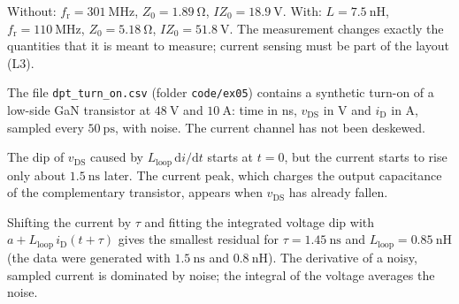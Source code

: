 
\begin{solutionblock}
	Without: $f_\mathrm{r}=\SI{301}{\mega\hertz}$, $Z_0=\SI{1.89}{\ohm}$, $IZ_0=\SI{18.9}{\volt}$. With: $L=\SI{7.5}{\nano\henry}$, $f_\mathrm{r}=\SI{110}{\mega\hertz}$, $Z_0=\SI{5.18}{\ohm}$, $IZ_0=\SI{51.8}{\volt}$. The measurement changes exactly the quantities that it is meant to measure; current sensing must be part of the layout (L3).
\end{solutionblock}



The file \texttt{dpt\_turn\_on.csv} (folder \texttt{code/ex05}) contains a synthetic turn-on of a low-side GaN transistor at $\SI{48}{\volt}$ and $\SI{10}{\ampere}$: time in ns, $v_\mathrm{DS}$ in V and $i_\mathrm{D}$ in A, sampled every $\SI{50}{\pico\second}$, with noise. The current channel has not been deskewed.


\begin{solutionblock}
	The dip of $v_\mathrm{DS}$ caused by $L_\mathrm{loop}\,\mathrm{d}i/\mathrm{d}t$ starts at $t=0$, but the current starts to rise only about $\SI{1.5}{\nano\second}$ later. The current peak, which charges the output capacitance of the complementary transistor, appears when $v_\mathrm{DS}$ has already fallen.
\end{solutionblock}


\begin{solutionblock}
	Shifting the current by $\tau$ and fitting the integrated voltage dip with $a+L_\mathrm{loop}\,i_\mathrm{D}(t+\tau)$ gives the smallest residual for $\tau=\SI{1.45}{\nano\second}$ and $L_\mathrm{loop}=\SI{0.85}{\nano\henry}$ (the data were generated with $\SI{1.5}{\nano\second}$ and $\SI{0.8}{\nano\henry}$). The derivative of a noisy, sampled current is dominated by noise; the integral of the voltage averages the noise.
\end{solutionblock}

